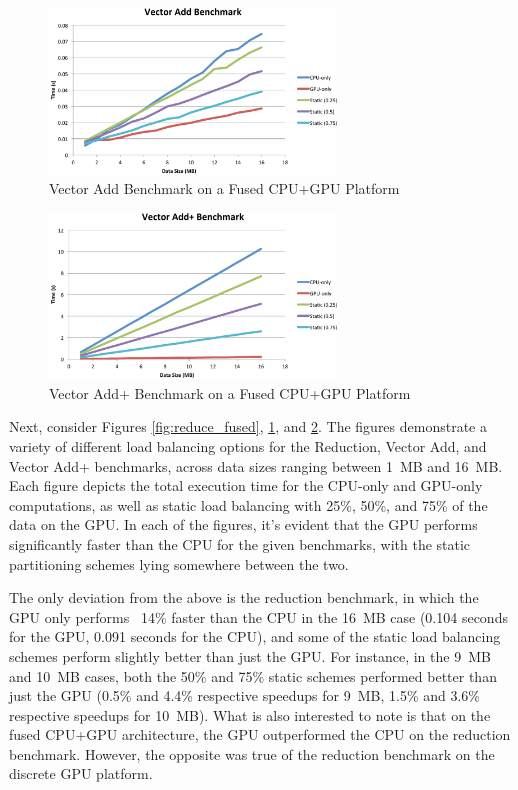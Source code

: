 \documentclass[journal]{IEEEtran}
\begin{document}
\begin{figure}[t]
\centering
\includegraphics[width=3.0in]{vector_fused}
\caption{Vector Add Benchmark on a Fused CPU+GPU Platform}
\label{fig:vector_fused}
\end{figure}

\begin{figure}[t]
\centering
\includegraphics[width=3.0in]{vector_plus_fused}
\caption{Vector Add+ Benchmark on a Fused CPU+GPU Platform}
\label{fig:vector_plus_fused}
\end{figure}

Next, consider Figures \ref{fig:reduce_fused}, \ref{fig:vector_fused}, and
\ref{fig:vector_plus_fused}. The figures demonstrate a variety of different
load balancing options for the Reduction, Vector Add, and Vector Add+
benchmarks, across data sizes ranging between 1~MB and 16~MB.  Each figure
depicts the total execution time for the CPU-only and GPU-only computations,
as well as static load balancing with 25\%, 50\%, and 75\% of the data on the
GPU.  In each of the figures, it's evident that the GPU performs significantly
faster than the CPU for the given benchmarks, with the static partitioning
schemes lying somewhere between the two.

The only deviation from the above is the reduction benchmark, in which the GPU
only performs ~14\% faster than the CPU in the 16~MB case (0.104 seconds for the
GPU, 0.091 seconds for the CPU), and some of the static load balancing schemes
perform slightly better than just the GPU.  For instance, in the 9~MB and 10~MB
cases, both the 50\% and 75\% static schemes performed better than just the GPU
(0.5\% and 4.4\% respective speedups for 9~MB, 1.5\% and 3.6\% respective speedups
for 10~MB). What is also interested to note is that on the fused CPU+GPU architecture,
the GPU outperformed the CPU on the reduction benchmark.  However, the opposite was
true of the reduction benchmark on the discrete GPU platform.
\end{document}
